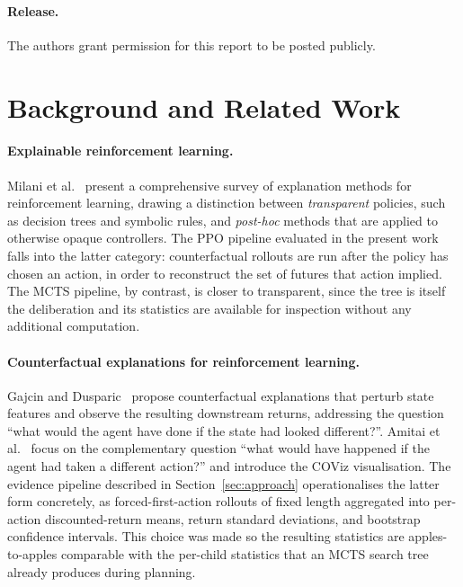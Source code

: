 \documentclass[conference]{IEEEtran}
\begin{document}
\paragraph{Release.}
The authors grant permission for this report to be posted publicly.

\section{Background and Related Work}
\label{sec:related}

\paragraph{Explainable reinforcement learning.}
Milani et al.~\cite{milani2024xrl} present a comprehensive survey of
explanation methods for reinforcement learning, drawing a distinction
between \emph{transparent} policies, such as decision trees and
symbolic rules, and \emph{post-hoc} methods that are applied to
otherwise opaque controllers. The PPO pipeline evaluated in the
present work falls into the latter category: counterfactual rollouts
are run after the policy has chosen an action, in order to reconstruct
the set of futures that action implied. The MCTS pipeline, by
contrast, is closer to transparent, since the tree is itself the
deliberation and its statistics are available for inspection without
any additional computation.

\paragraph{Counterfactual explanations for reinforcement learning.}
Gajcin and Dusparic~\cite{gajcin2024cf} propose counterfactual
explanations that perturb state features and observe the resulting
downstream returns, addressing the question ``what would the agent
have done if the state had looked different?''. Amitai et
al.~\cite{amitai2024coviz} focus on the complementary question ``what
would have happened if the agent had taken a different action?'' and
introduce the COViz visualisation. The evidence pipeline described in
Section~\ref{sec:approach} operationalises the latter form concretely,
as forced-first-action rollouts of fixed length aggregated into
per-action discounted-return means, return standard deviations, and
bootstrap confidence intervals. This choice was made so the resulting
statistics are apples-to-apples comparable with the per-child
statistics that an MCTS search tree already produces during planning.
\end{document}
